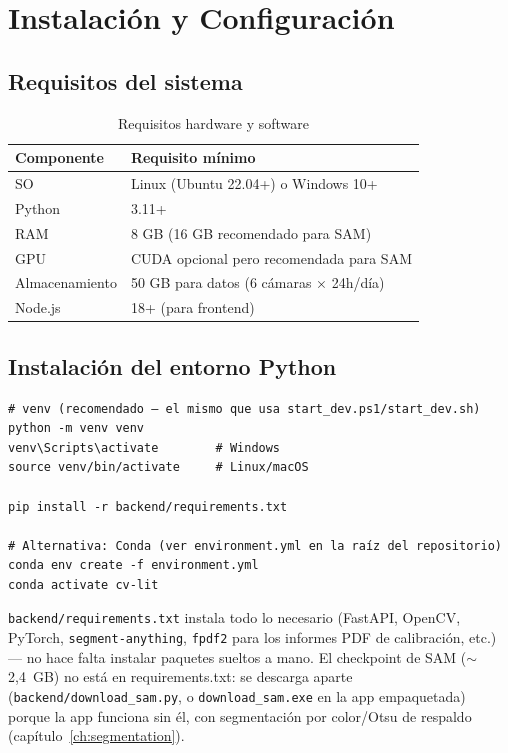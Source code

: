 \chapter{Instalación y Configuración}
\label{ch:setup}

\section{Requisitos del sistema}

\begin{table}[H]
\centering
\caption{Requisitos hardware y software}
\begin{tabular}{L{4cm} L{8cm}}
\toprule
\textbf{Componente} & \textbf{Requisito mínimo} \\
\midrule
SO & Linux (Ubuntu 22.04+) o Windows 10+ \\
Python & 3.11+ \\
RAM & 8 GB (16 GB recomendado para SAM) \\
GPU & CUDA opcional pero recomendada para SAM \\
Almacenamiento & 50 GB para datos (6 cámaras × 24h/día) \\
Node.js & 18+ (para frontend) \\
\bottomrule
\end{tabular}
\end{table}

\section{Instalación del entorno Python}

\begin{codebox}[]
\begin{verbatim}
# venv (recomendado — el mismo que usa start_dev.ps1/start_dev.sh)
python -m venv venv
venv\Scripts\activate        # Windows
source venv/bin/activate     # Linux/macOS

pip install -r backend/requirements.txt

# Alternativa: Conda (ver environment.yml en la raíz del repositorio)
conda env create -f environment.yml
conda activate cv-lit
\end{verbatim}
\end{codebox}

\texttt{backend/requirements.txt} instala todo lo necesario (FastAPI, OpenCV, PyTorch,
\texttt{segment-anything}, \texttt{fpdf2} para los informes PDF de calibración, etc.) — no hace
falta instalar paquetes sueltos a mano. El checkpoint de SAM ($\sim$2,4~GB) no está en
requirements.txt: se descarga aparte (\texttt{backend/download\_sam.py}, o
\texttt{download\_sam.exe} en la app empaquetada) porque la app
funciona sin él, con segmentación por color/Otsu de respaldo (capítulo~\ref{ch:segmentation}).

